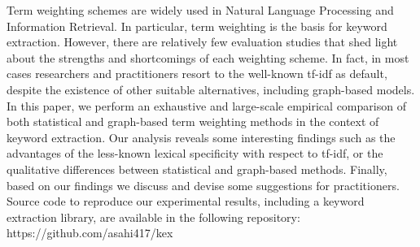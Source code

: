 Term weighting schemes are widely used in Natural Language Processing and Information Retrieval. In particular, term weighting is the basis for keyword extraction. However, there are relatively few evaluation studies that shed light about the strengths and shortcomings of each weighting scheme. In fact, in most cases researchers and practitioners resort to the well-known tf-idf as default, despite the existence of other suitable alternatives, including graph-based models. In this paper, we perform an exhaustive and large-scale empirical comparison of both statistical and graph-based term weighting methods in the context of keyword extraction. Our analysis reveals some interesting findings such as the advantages of the less-known lexical specificity with respect to tf-idf, or the qualitative differences between statistical and graph-based methods. Finally, based on our findings we discuss and devise some suggestions for practitioners. Source code to reproduce our experimental results, including a keyword extraction library, are available in the following repository:  https://github.com/asahi417/kex
